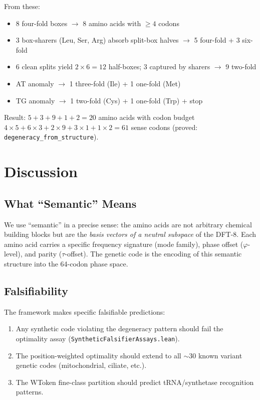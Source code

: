 \documentclass[11pt,twocolumn]{article}
\begin{document}
From these:
\begin{itemize}
\item 8 four-fold boxes $\to$ 8 amino acids with $\geq 4$ codons
\item 3 box-sharers (Leu, Ser, Arg) absorb split-box halves $\to$ 5
  four-fold + 3 six-fold
\item 6 clean splits yield $2 \times 6 = 12$ half-boxes; 3 captured by
  sharers $\to$ 9 two-fold
\item AT anomaly $\to$ 1 three-fold (Ile) + 1 one-fold (Met)
\item TG anomaly $\to$ 1 two-fold (Cys) + 1 one-fold (Trp) + stop
\end{itemize}

Result: $5 + 3 + 9 + 1 + 2 = 20$ amino acids with codon budget
$4{\times}5 + 6{\times}3 + 2{\times}9 + 3{\times}1 + 1{\times}2 = 61$
sense codons (proved: \texttt{degeneracy\_from\_structure}).

\section{Discussion}

\subsection{What ``Semantic'' Means}

We use ``semantic'' in a precise sense: the amino acids are not arbitrary
chemical building blocks but are the \emph{basis vectors of a neutral
subspace} of the DFT-8. Each amino acid carries a specific frequency
signature (mode family), phase offset ($\varphi$-level), and parity
($\tau$-offset). The genetic code is the encoding of this semantic structure
into the 64-codon phase space.

\subsection{Falsifiability}

The framework makes specific falsifiable predictions:
\begin{enumerate}
\item Any synthetic code violating the degeneracy pattern should fail
  the optimality assay (\texttt{SyntheticFalsifierAssays.lean}).
\item The position-weighted optimality should extend to all ${\sim}30$
  known variant genetic codes (mitochondrial, ciliate, etc.).
\item The WToken fine-class partition should predict tRNA/synthetase
  recognition patterns.
\end{enumerate}
\end{document}
